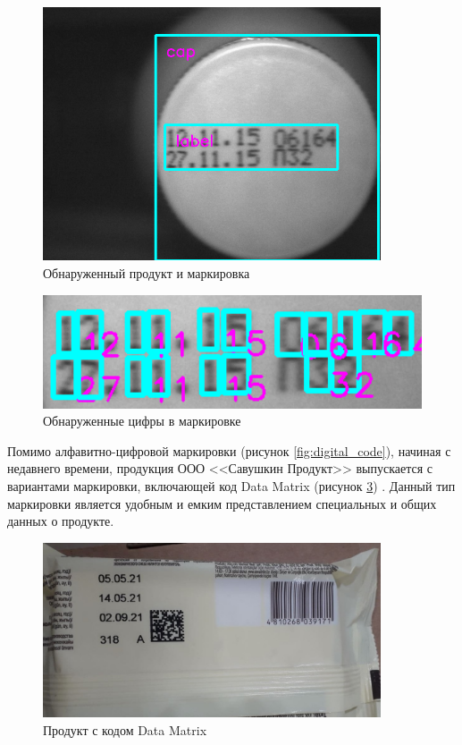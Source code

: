 \begin{figure}[!ht]
	\centering
	\includegraphics[width=10cm]{man-source/images/ch4/pic4-25.png}
	\caption{Обнаруженный продукт и маркировка}
	\label{fig:product_detect}
\end{figure}

\begin{figure}[!ht]
	\centering
	\includegraphics[width=12cm]{man-source/images/ch4/pic4-26.png}
	\caption{Обнаруженные цифры в маркировке}
	\label{fig:numbers_detect}
\end{figure}

Помимо алфавитно-цифровой маркировки (рисунок \ref{fig:digital_code}), начиная с недавнего времени, продукция ООО <<Савушкин Продукт>> выпускается с вариантами маркировки, включающей код Data Matrix (рисунок \ref{fig:data_matrix}) \cite{milk}. Данный тип маркировки является удобным и емким представлением специальных и общих данных о продукте. 


\begin{figure}[!ht]
	\centering
	\includegraphics[width=10cm]{man-source/images/ch4/pic4-2.jpg}
	\caption{Продукт с кодом Data Matrix}
	\label{fig:data_matrix}
\end{figure}

